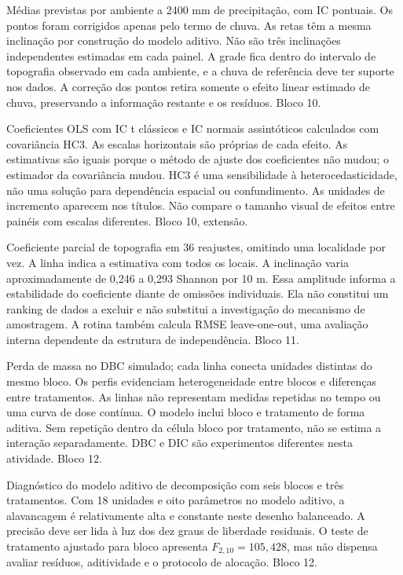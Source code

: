 {Médias previstas por ambiente a 2400 mm de precipitação, com IC pontuais. Os pontos foram corrigidos apenas pelo termo de chuva.}
{As retas têm a mesma inclinação por construção do modelo aditivo. Não são três inclinações independentes estimadas em cada painel. A grade fica dentro do intervalo de topografia observado em cada ambiente, e a chuva de referência deve ter suporte nos dados. A correção dos pontos retira somente o efeito linear estimado de chuva, preservando a informação restante e os resíduos. Bloco 10.}

{Coeficientes OLS com IC t clássicos e IC normais assintóticos calculados com covariância HC3. As escalas horizontais são próprias de cada efeito.}
{As estimativas são iguais porque o método de ajuste dos coeficientes não mudou; o estimador da covariância mudou. HC3 é uma sensibilidade à heterocedasticidade, não uma solução para dependência espacial ou confundimento. As unidades de incremento aparecem nos títulos. Não compare o tamanho visual de efeitos entre painéis com escalas diferentes. Bloco 10, extensão.}

{Coeficiente parcial de topografia em 36 reajustes, omitindo uma localidade por vez. A linha indica a estimativa com todos os locais.}
{A inclinação varia aproximadamente de 0,246 a 0,293 Shannon por 10 m. Essa amplitude informa a estabilidade do coeficiente diante de omissões individuais. Ela não constitui um ranking de dados a excluir e não substitui a investigação do mecanismo de amostragem. A rotina também calcula RMSE leave-one-out, uma avaliação interna dependente da estrutura de independência. Bloco 11.}

{Perda de massa no DBC simulado; cada linha conecta unidades distintas do mesmo bloco.}
{Os perfis evidenciam heterogeneidade entre blocos e diferenças entre tratamentos. As linhas não representam medidas repetidas no tempo ou uma curva de dose contínua. O modelo inclui bloco e tratamento de forma aditiva. Sem repetição dentro da célula bloco por tratamento, não se estima a interação separadamente. DBC e DIC são experimentos diferentes nesta atividade. Bloco 12.}

{Diagnóstico do modelo aditivo de decomposição com seis blocos e três tratamentos.}
{Com 18 unidades e oito parâmetros no modelo aditivo, a alavancagem é relativamente alta e constante neste desenho balanceado. A precisão deve ser lida à luz dos dez graus de liberdade residuais. O teste de tratamento ajustado para bloco apresenta $F_{2,10}=105{,}428$, mas não dispensa avaliar resíduos, aditividade e o protocolo de alocação. Bloco 12.}
